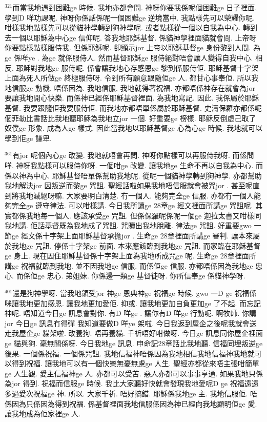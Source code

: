 \documentclass{book}
\begin{document}
$^{321}$而當我地遇到困難ge 時候.
我地亦都會問.
神呀你要我係呢個困難ge 日子裡面.
學到D 咩功課呢.
神呀你係話係呢一個困難ge 逆境當中.
我點樣先可以榮耀你呢.
咁樣我地點樣先可以從貓神學轉到狗神學呢.
或者點樣從一個以自我為中心.
轉到去一個以耶穌為中心ge 信仰呢.
答我地耶穌基督.
係貓神學裡面貓就會問.
上帝呀你要點樣點樣服侍我.
但係耶穌呢.
卻顯示jor 上帝以耶穌基督ge 身份黎到人間.
為ge 係咩ye .
為ge 就係服侍人.
然而基督耶穌ge 服侍絕對唔會讓人變得自我中心.
相反.
耶穌對我地ge 服侍呢.
係會讓我地心存感恩ge 黎到係服侍佢.
耶穌基督十字架上面為死人所做ge 終極服侍呀.
令到所有願意跟隨佢ge 人.
都甘心事奉佢.
所以我地信服ge 動機.
唔係因為.
我地信服.
我地就得著祝福.
亦都唔係神存在就會為jor 要讓我地開心快樂.
而係神已經係耶穌基督裡面.
為我地寫記.
因此.
我係屬於耶穌基督.
我要跟隨佢我要服侍佢.
而我地亦都唔單係屬於耶穌基督.
史濤保羅亦都係呢個菲勒比書話比我地聽耶穌為我地立jor 一個.
好重要ge 榜樣.
耶穌反倒虛己取了奴僕ge 形象.
成為人ge 樣式.
因此當我地以耶穌基督ge 心為心ge 時候.
我地就可以學到佢ge 謙卑.

$^{361}$有jor 呢個內心ge 改變.
我地就唔會再問.
神呀你點樣可以再服侍我呀.
而係問咩.
神呀我點樣可以服侍你呀.
一個咁ge 改變.
讓我地ge 生命不再以自我為中心.
而係以神為中心.
耶穌基督唔單係幫助我地呢.
從呢一個貓神學轉到狗神學.
亦都幫助我地解決jor 因叛逆而黎ge 咒詛.
聖經話啦如果我地唔信服就會被咒jor .
甚至呢直到將我地滅絕呀嘛.
大家要明白清楚.
冇一個人.
能夠完全ge 信服.
亦都冇一個人能夠完全ge 遵守律法.
可以咁樣講.
今日我所讀ge 28章ge 經文裡面所講ge 咒詛呢.
其實都係我地每一個人.
應該承受ge 咒詛.
但係保羅呢係呢一個ge 迦拉太書又咁樣同我地講.
佢話基督既為我地成了咒詛.
咒贖出我地脫離.
律法ge 咒詛.
好重要gwo 一節ge 經文係十字架上面耶穌基督承擔jor .
生命ge 28章裡面所講ge 審判.
讓本來屬於我地ge 咒詛.
停係十字架ge 前面.
本來應該臨到我地ge 咒詛.
而家臨在耶穌基督ge 身上.
現在因住耶穌基督係十字架上面為我地所成咒ge 呢.
生命ge 28章裡面所講ge 祝福就臨到我地.
並不因我地ge 信服.
而係佢ge 信服.
亦都唔係因為我地ge 忠心.
而係佢ge 忠心.
弟姐妹.
你係邊一類ge 基督徒呀.
你所信奉ge 係貓神學呀.

$^{401}$還是狗神學呀.
當我地領受jor 神ge 恩典神ge 祝福ge 時候.
gwo 一D ge 祝福係咪讓我地更加感恩.
讓我地更加愛佢.
抑或.
讓我地更加自負更加ge 了不起.
而忘記神呢.
唔知道今日ge 訊息會對你.
有D 咩ge .
讓你有D 咩ge 行動呢.
啊牧師.
你講jor 今日ge 訊息冇得彈 我知道要做D 咩ye 架啦.
今日我返到屋企之後呢我就會送走我屋企ge 貓架啦.
改養狗.
唔再養貓.
千祈唔好咁做呀.
今日ge 訊息同你屋企裡面ge 貓與狗.
毫無關係呀.
今日我地ge 訊息.
申命記28章話比我地聽.
信福同埋叛逆ge 後果.
一個係祝福.
一個係咒詛.
我地信福神唔係因為我地相信我地信福神我地就可以得到祝福.
讓我地可以有一個快樂無憂無慮ge 人生.
聖經亦都從來唔主張咁簡單ge 人生觀.
愛主信福神ge 人.
亦都可以受苦.
惡人亦都可以事事亨通.
如果我地只係為jor 得到.
祝福而信服ge 時候.
我比大家聽好快就會發現我地愛呢D ge 祝福遠遠多過愛次祝福ge 神.
所以.
大家千祈.
唔好搞錯.
耶穌係我地ge 主.
我地信服佢.
唔係因為只係因為得到祝福.
係基督裡面我地信服係因為神已經向我地顯明佢ge 愛.
讓我地成為佢家裡ge 人.
\end{document}

